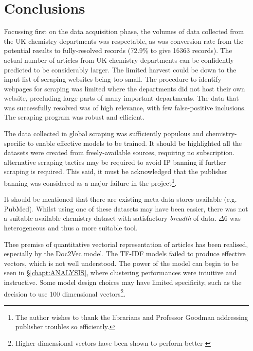\chapter{Conclusions}
\addtocounter{page}{1}
Focussing first on the data acquisition phase, the volumes of data collected from the UK chemistry departments was respectable, as was conversion rate from the potential results to fully-resolved records (72.9\%  to give 16363 records). The actual number of articles from UK chemistry departments can be confidently predicted to be considerably larger. The limited harvest could be down to the input list of scraping websites being too small. The procedure to identify webpages for scraping was limited where the departments did not host their own website, precluding large parts of many important departments. The data that was successfully resolved was of high relevance, with few false-positive inclusions. The scraping program was robust and efficient.

The data collected in global scraping was sufficiently populous and chemistry-specific to enable effective models to be trained. It should be highlighted all the datasets were created from freely-available sources, requiring no subscription. alternative scraping tactics may be required to avoid IP banning if further scraping is required. This said, it must be acknowledged that the publisher banning was considered as a major failure in the project\footnote{The author wishes to thank the librarians and Professor Goodman addressing publisher troubles so efficiently.}.

It should be mentioned that there are existing meta-data stores available (e.g. PubMed). Whilst using one of these datasets may have been easier, there was not a suitable available chemistry dataset with satisfactory \emph{breadth} of data. $\Delta6$ was heterogeneous and thus a more suitable tool.

Thee premise of quantitative vectorial representation of articles has been realised, especially by the Doc2Vec model. The TF-IDF models failed to produce effective vectors, which is not well understood. The power of the model can begin to be seen in \S\ref{chapt:ANALYSIS}, where clustering performances were intuitive and instructive.
Some model design choices may have limited specificity, such as the decision to use 100 dimensional vectors\footnote{Higher dimensional vectors have been shown to perform better \cite{word2vec1}}.
\newpage

